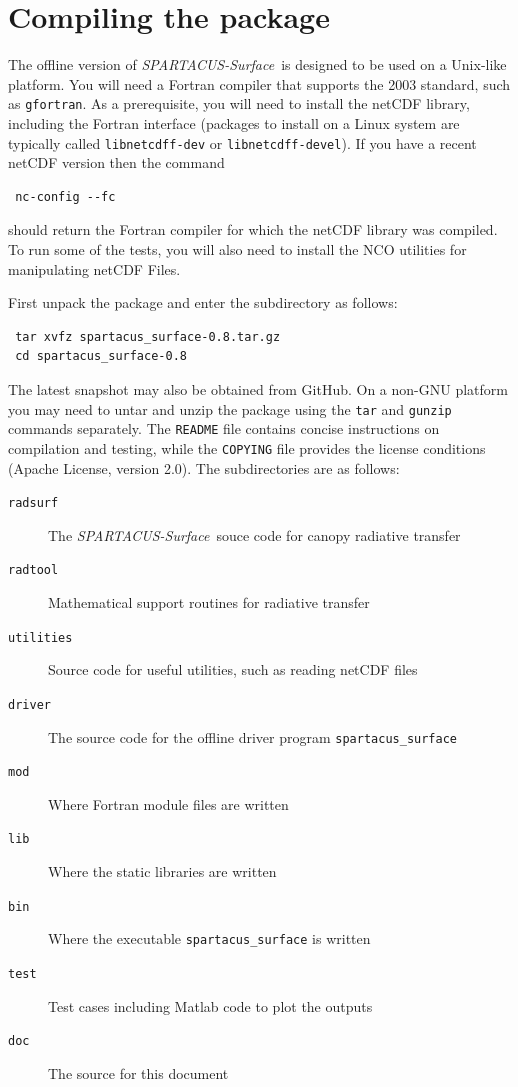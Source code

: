 \documentclass[a4,oneside]{article}
\def\codesize{\small}
\def\spsurf{\emph{SPARTACUS-Surface}}
\def\code#1{{\codesize\texttt{#1}}}
\def\citem#1{\item[{\codesize\texttt{#1}}]}
\def\chapter{\section}
\begin{document}

\section{Compiling the package}
\label{sec:compile}
The offline version of \spsurf\ is designed to be used on a Unix-like
platform. You will need a Fortran compiler that supports the 2003
standard, such as \code{gfortran}.
%
As a prerequisite, you will need to install the netCDF library,
including the Fortran interface (packages to install on a Linux system
are typically called \code{libnetcdff-dev} or
\code{libnetcdff-devel}).  If you have a recent netCDF version then
the command
\begin{lstlisting}
 nc-config --fc
\end{lstlisting}
should return the Fortran compiler for which the netCDF library was
compiled.  To run some of the tests, you will also need to install the
NCO utilities for manipulating netCDF Files.

First unpack the package and enter the subdirectory as follows:
\begin{lstlisting}
 tar xvfz spartacus_surface-0.8.tar.gz
 cd spartacus_surface-0.8
\end{lstlisting}
The latest snapshot may also be obtained from GitHub.  On a non-GNU
platform you may need to untar and unzip the package using the
\code{tar} and \code{gunzip} commands separately. The \code{README}
file contains concise instructions on compilation and testing, while
the \code{COPYING} file provides the license conditions (Apache
License, version 2.0). The subdirectories are as follows:
%
\begin{description}
\citem{radsurf} The \spsurf\ souce code for canopy radiative transfer
\citem{radtool} Mathematical support routines for radiative transfer
\citem{utilities} Source code for useful utilities, such as reading netCDF
       files
\citem{driver} The source code for the offline driver program \code{spartacus\_surface}
\citem{mod} Where Fortran module files are written
\citem{lib} Where the static libraries are written
\citem{bin} Where the executable \code{spartacus\_surface} is written
\citem{test} Test cases including Matlab code to plot the outputs
\citem{doc} The source for this document
\end{description}
\end{document}
